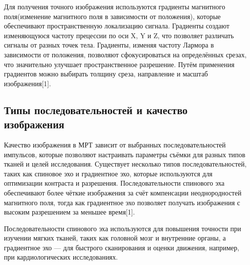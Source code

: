Для получения точного изображения используются градиенты магнитного поля(изменение магнитного поля в зависимости от положения), которые обеспечивают пространственную локализацию сигнала. Градиенты создают изменяющуюся частоту прецессии по оси X, Y и Z, что позволяет различать сигналы от разных точек тела. Градиенты, изменяя частоту Лармора в зависимости от положения, позволяют сфокусироваться на определённых срезах, что значительно улучшает пространственное разрешение. Путём применения градиентов можно выбирать толщину среза, направление и масштаб изображения[1].

\subsection{Типы последовательностей и качество изображения}

Качество изображения в МРТ зависит от выбранных последовательностей импульсов, которые позволяют настраивать параметры съёмки для разных типов тканей и целей исследования. Существует несколько типов последовательностей, таких как спиновое эхо и градиентное эхо, которые используются для оптимизации контраста и разрешения. Последовательности спинового эха обеспечивают более чёткие изображения за счёт компенсации неоднородностей магнитного поля, тогда как градиентное эхо позволяет получать изображения с высоким разрешением за меньшее время[1].

Последовательности спинового эха используются для повышения точности при изучении мягких тканей, таких как головной мозг и внутренние органы, а градиентное эхо — для быстрого сканирования и оценки движения, например, при кардиологических исследованиях.
